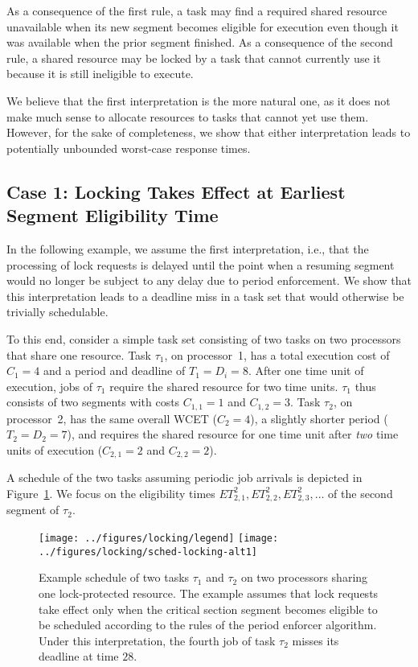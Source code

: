 As a consequence of the first rule, a task may find a required shared resource unavailable when its new segment becomes eligible for execution even though it was available when the prior segment finished.  As a consequence of the second rule, a shared resource may be locked by a task that cannot currently use it  because it is still ineligible to execute.

We believe that the first interpretation is the more natural one, as it does not make much sense to allocate resources to tasks that cannot yet use them. However, for the sake of completeness, we show that either interpretation leads to potentially unbounded worst-case response times.

\subsection{Case 1: Locking Takes Effect at Earliest Segment Eligibility Time}
In the following example, we assume the first interpretation, i.e., that the processing of lock requests is delayed until the point when a resuming segment would no longer be subject to any delay due to period enforcement. We show that this interpretation leads to a deadline miss in a task set that would otherwise be trivially schedulable.

To this end, consider a simple task set consisting of two tasks on two processors that share one resource. Task $\tau_1$, on processor~1, has a total execution cost of $C_1 = 4$ and a period and deadline of $T_1 = D_i = 8$. After one time unit of execution, jobs of $\tau_1$ require the shared resource for two time units. $\tau_1$ thus consists of two segments with costs $C_{1,1} = 1$ and $C_{1,2} = 3$. Task $\tau_2$, on processor~2, has the same overall WCET ($C_2 = 4$), a slightly shorter period ($T_2 = D_2 = 7$), and requires the shared resource for one time unit after \emph{two} time units of execution ($C_{2,1} = 2$ and $C_{2,2} = 2$).

A schedule of the two tasks assuming periodic job arrivals is depicted in Figure~\ref{fig:locking-alt1}. We focus on the eligibility times $ET_{2,1}^2,ET_{2,2}^2,ET_{2,3}^2,\ldots$ of the second segment of $\tau_2$.

\begin{figure}[t]
  \centering
  \texttt{[image: ../figures/locking/legend]}
  \texttt{[image: ../figures/locking/sched-locking-alt1]}
  \caption{Example schedule of two tasks $\tau_1$ and $\tau_2$ on two processors sharing one lock-protected resource. The example assumes that lock requests take effect only when the critical section segment  becomes eligible to be scheduled according to the rules of the period enforcer algorithm. Under this interpretation, the fourth job of task $\tau_2$ misses its deadline at time $28$.}
  \label{fig:locking-alt1}
  \end{figure}


